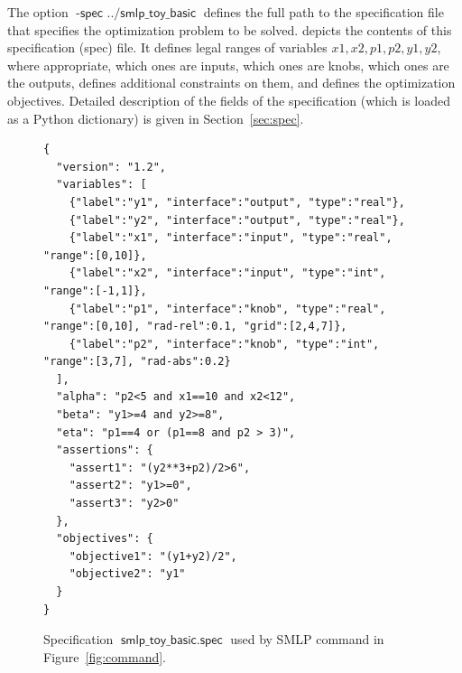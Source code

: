 \documentclass[a4paper,parskip=half]{article} %
\newcommand*\option[1]{\operatorname{\mathsf{#1}}} %
\newcommand*\optionval[2]{\operatorname{\mathsf{#1}\,\,\mathsf{#2}}} %
\begin{document}
The option $\optionval{-spec}{../smlp\_toy\_basic}$ defines the full path to the specification file that 
specifies the optimization problem to be solved.   depicts the contents of 
this specification (spec) file. It defines legal ranges of variables $x1, x2, p1, p2, y1, y2$, 
where appropriate, which ones are inputs, which ones are knobs, which ones are the outputs, defines additional 
constraints on them, and defines the optimization objectives. Detailed description of the fields of the specification
(which is loaded as a Python dictionary) is given in Section~\ref{sec:spec}.

\begin{figure}%
\small
\begin{verbatim}
{
  "version": "1.2",
  "variables": [
    {"label":"y1", "interface":"output", "type":"real"},
    {"label":"y2", "interface":"output", "type":"real"},
    {"label":"x1", "interface":"input", "type":"real", "range":[0,10]},
    {"label":"x2", "interface":"input", "type":"int", "range":[-1,1]},
    {"label":"p1", "interface":"knob", "type":"real", "range":[0,10], "rad-rel":0.1, "grid":[2,4,7]},
    {"label":"p2", "interface":"knob", "type":"int", "range":[3,7], "rad-abs":0.2}
  ],
  "alpha": "p2<5 and x1==10 and x2<12",
  "beta": "y1>=4 and y2>=8",
  "eta": "p1==4 or (p1==8 and p2 > 3)",
  "assertions": {
    "assert1": "(y2**3+p2)/2>6",
    "assert2": "y1>=0",
    "assert3": "y2>0"
  },
  "objectives": {
    "objective1": "(y1+y2)/2",
    "objective2": "y1"
  }
}
\end{verbatim}
\vspace*{-1\baselineskip}
\caption{Specification $\option{smlp\_toy\_basic.spec}$ used by SMLP command in Figure~\cref{fig:command}.}
\label{fig:spec}
\end{figure}
\end{document}
